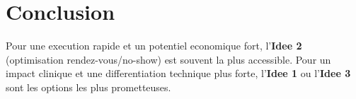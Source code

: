 \documentclass[11pt,a4paper]{article}
\begin{document}
\section*{Conclusion}
Pour une execution rapide et un potentiel economique fort, l'\textbf{Idee 2}
(optimisation rendez-vous/no-show) est souvent la plus accessible.
Pour un impact clinique et une differentiation technique plus forte,
l'\textbf{Idee 1} ou l'\textbf{Idee 3} sont les options les plus prometteuses.
\end{document}
